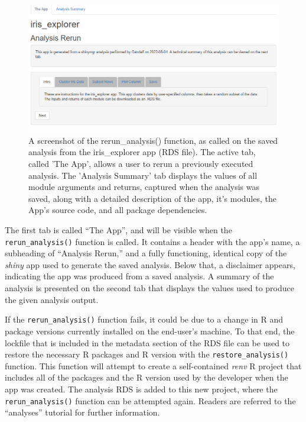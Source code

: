 \begin{figure}
\includegraphics[width=1\linewidth]{images/figure7} \caption{A screenshot of the rerun\_analysis() function, as called on the saved analysis from the iris\_explorer app (RDS file). The active tab, called 'The App', allows a user to rerun a previously executed analysis. The 'Analysis Summary' tab displays the values of all module arguments and returns, captured when the analysis was saved, along with a detailed description of the app, it's modules, the App's source code, and all package dependencies.}\label{fig:fig7}
\end{figure}

The first tab is called ``The App'', and will be visible when the \texttt{rerun\_analysis()} function is called. It contains a header with the app's name, a subheading of ``Analysis Rerun,'' and a fully functioning, identical copy of the \emph{shiny} app used to generate the saved analysis. Below that, a disclaimer appears, indicating the app was produced from a saved analysis. A summary of the analysis is presented on the second tab that displays the values used to produce the given analysis output.

If the \texttt{rerun\_analysis()} function fails, it could be due to a change in R and package versions currently installed on the end-user's machine. To that end, the lockfile that is included in the metadata section of the RDS file can be used to restore the necessary R packages and R version with the \texttt{restore\_analysis()} function. This function will attempt to create a self-contained \emph{renv} R project that includes all of the packages and the R version used by the developer when the app was created. The analysis RDS is added to this new project, where the \texttt{rerun\_analysis()} function can be attempted again. Readers are referred to the ``analyses'' tutorial for further information.

